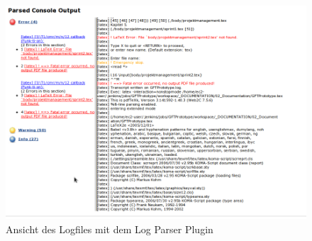 \begin{figure}[!h]
	\centering
	\includegraphics[scale=0.35]{images/infrastruktur/jenkins-parsed-output}
	\caption{Ansicht des Logfiles mit dem Log Parser Plugin}
	\label{jenkins-parsed-output}
\end{figure}

